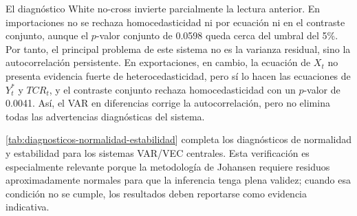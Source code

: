 \documentclass[11pt,a4paper]{article}
\begin{document}
	El diagnóstico White no-cross invierte parcialmente la lectura anterior. En
	importaciones no se rechaza homocedasticidad ni por ecuación ni en el contraste
	conjunto, aunque el \(p\)-valor conjunto de 0.0598 queda cerca del umbral del
	5\%. Por tanto, el principal problema de este sistema no es la varianza
	residual, sino la autocorrelación persistente. En exportaciones, en cambio, la
	ecuación de \(X_t\) no presenta evidencia fuerte de heterocedasticidad, pero sí
	lo hacen las ecuaciones de \(Y_t^*\) y \(TCR_t\), y el contraste conjunto
	rechaza homocedasticidad con un \(p\)-valor de 0.0041. Así, el VAR en
	diferencias corrige la autocorrelación, pero no elimina todas las advertencias
	diagnósticas del sistema.
	
\autoref{tab:diagnosticos-normalidad-estabilidad} completa los diagnósticos de
normalidad y estabilidad para los sistemas VAR/VEC centrales. Esta verificación
es especialmente relevante porque la metodología de Johansen requiere residuos
aproximadamente normales para que la inferencia tenga plena validez; cuando esa
condición no se cumple, los resultados deben reportarse como evidencia
indicativa.

\begin{table}[H]
\centering
\caption{Diagnósticos complementarios de normalidad y estabilidad.}
\label{tab:diagnosticos-normalidad-estabilidad}
\scriptsize
{}
\caption*{\footnotesize Nota: la estabilidad se evalúa por el módulo máximo de
las raíces del VAR; valores menores que uno indican estabilidad. Fuente:
.}
\end{table}
\end{document}
